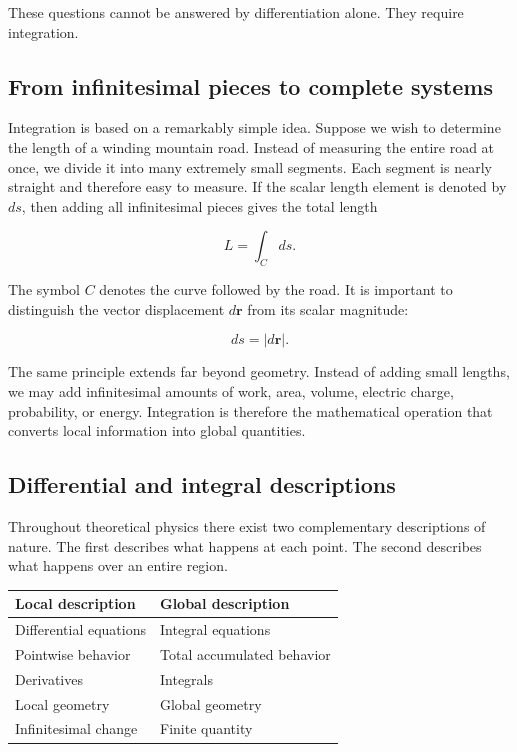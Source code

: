These questions cannot be answered by differentiation alone. They require
integration.

\subsection{From infinitesimal pieces to complete systems}

Integration is based on a remarkably simple idea. Suppose we wish to determine
the length of a winding mountain road. Instead of measuring the entire road at
once, we divide it into many extremely small segments. Each segment is nearly
straight and therefore easy to measure. If the scalar length element is denoted
by $ds$, then adding all infinitesimal pieces gives the total length

\begin{equation}
  \boxed{L=\int_C ds.}
\end{equation}

The symbol $C$ denotes the curve followed by the road. It is important to
distinguish the vector displacement $d\mathbf r$ from its scalar magnitude:

\begin{equation}
  ds=\lvert d\mathbf r\rvert.
\end{equation}

The same principle extends far beyond geometry. Instead of adding small
lengths, we may add infinitesimal amounts of work, area, volume, electric
charge, probability, or energy. Integration is therefore the mathematical
operation that converts local information into global quantities.

\subsection{Differential and integral descriptions}

Throughout theoretical physics there exist two complementary descriptions of
nature. The first describes what happens at each point. The second describes
what happens over an entire region.

\begin{center}
\begin{tabular}{ll}
\toprule
\textbf{Local description} & \textbf{Global description} \\
\midrule
Differential equations & Integral equations \\
Pointwise behavior & Total accumulated behavior \\
Derivatives & Integrals \\
Local geometry & Global geometry \\
Infinitesimal change & Finite quantity \\
\bottomrule
\end{tabular}
\end{center}

